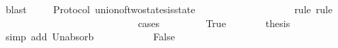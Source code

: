 \begin{isabellebody}
\ blast\isanewline
\ \ \isamarkupfalse%
\isanewline
{}\isamarkupfalse%
%
\endisatagproof
{\isafoldproof}%
%
\isadelimproof
\isanewline
%
\endisadelimproof
\isanewline
{}\isamarkupfalse%
\ {\isacharparenleft}\ Protocol{\isacharparenright}\ union{\isacharunderscore}of{\isacharunderscore}two{\isacharunderscore}states{\isacharunderscore}is{\isacharunderscore}state\ {\isacharcolon}\isanewline
\ \ {\isachardoublequoteopen}{\isasymforall}\ {\isasymsigma}{}\ {\isasymin}\ {\isasymSigma}{\isachardot}\ {\isasymforall}\ {\isasymsigma}{}\ {\isasymin}\ {\isasymSigma}{\isachardot}\ {\isacharparenleft}{\isasymsigma}{}\ {\isasymunion}\ {\isasymsigma}{}{\isacharparenright}\ {\isasymin}\ {\isasymSigma}{\isachardoublequoteclose}\isanewline
%
\isadelimproof
\ \ %
\endisadelimproof
%
\isatagproof
{}\isamarkupfalse%
\ {\isacharparenleft}rule{\isacharcomma}\ rule{\isacharparenright}\isanewline
{}\isamarkupfalse%
\ {\isacharminus}\ \isanewline
\ \ \isamarkupfalse%
\ {\isasymsigma}{}\ {\isasymsigma}{}\isanewline
\ \ \isamarkupfalse%
\ {\isachardoublequoteopen}{\isasymsigma}{}\ {\isasymin}\ {\isasymSigma}{\isachardoublequoteclose}\ \ {\isachardoublequoteopen}{\isasymsigma}{}\ {\isasymin}\ {\isasymSigma}{\isachardoublequoteclose}\isanewline
\ \ \isamarkupfalse%
\ {\isachardoublequoteopen}{\isasymsigma}{}\ {\isasymunion}\ {\isasymsigma}{}\ {\isasymin}\ {\isasymSigma}{\isachardoublequoteclose}\isanewline
\ \ \isamarkupfalse%
\ {\isacharparenleft}cases\ {\isachardoublequoteopen}{\isasymsigma}{}\ {\isasymsubseteq}\ {\isasymsigma}{}{\isachardoublequoteclose}{\isacharparenright}\isanewline
\ \ \ \ \isamarkupfalse%
\ True\isanewline
\ \ \ \ \isamarkupfalse%
\ \isamarkupfalse%
\ {\isacharquery}thesis\isanewline
\ \ \ \ \ \ \isamarkupfalse%
\ {\isacharparenleft}simp\ add{\isacharcolon}\ Un{\isacharunderscore}absorb{}\ {\isacartoucheopen}{\isasymsigma}{}\ {\isasymin}\ {\isasymSigma}{\isacartoucheclose}{\isacharparenright}\isanewline
\ \ \isamarkupfalse%
\isanewline
\ \ \ \ \isamarkupfalse%
\ False\isanewline
\ \ \ \ \isamarkupfalse%
\ \isamarkupfalse%
\ {\isachardoublequoteopen}{\isasymnot}\ {\isasymsigma}{}\ {\isasymsubseteq}\ {\isasymsigma}{}{\isachardoublequoteclose}\ \isamarkupfalse%

\end{isabellebody}
